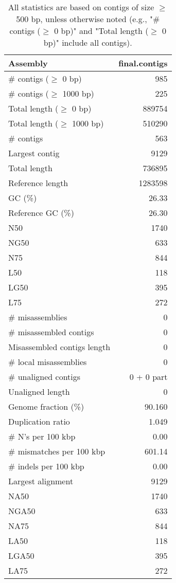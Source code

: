 \documentclass[12pt,a4paper]{article}
\begin{document}
\begin{table}[ht]
\begin{center}
\caption{All statistics are based on contigs of size $\geq$ 500 bp, unless otherwise noted (e.g., "\# contigs ($\geq$ 0 bp)" and "Total length ($\geq$ 0 bp)" include all contigs).}
\begin{tabular}{|l*{1}{|r}|}
\hline
Assembly & final.contigs \\ \hline
\# contigs ($\geq$ 0 bp) & 985 \\ \hline
\# contigs ($\geq$ 1000 bp) & 225 \\ \hline
Total length ($\geq$ 0 bp) & 889754 \\ \hline
Total length ($\geq$ 1000 bp) & 510290 \\ \hline
\# contigs & 563 \\ \hline
Largest contig & 9129 \\ \hline
Total length & 736895 \\ \hline
Reference length & 1283598 \\ \hline
GC (\%) & 26.33 \\ \hline
Reference GC (\%) & 26.30 \\ \hline
N50 & 1740 \\ \hline
NG50 & 633 \\ \hline
N75 & 844 \\ \hline
L50 & 118 \\ \hline
LG50 & 395 \\ \hline
L75 & 272 \\ \hline
\# misassemblies & 0 \\ \hline
\# misassembled contigs & 0 \\ \hline
Misassembled contigs length & 0 \\ \hline
\# local misassemblies & 0 \\ \hline
\# unaligned contigs & 0 + 0 part \\ \hline
Unaligned length & 0 \\ \hline
Genome fraction (\%) & 90.160 \\ \hline
Duplication ratio & 1.049 \\ \hline
\# N's per 100 kbp & 0.00 \\ \hline
\# mismatches per 100 kbp & 601.14 \\ \hline
\# indels per 100 kbp & 0.00 \\ \hline
Largest alignment & 9129 \\ \hline
NA50 & 1740 \\ \hline
NGA50 & 633 \\ \hline
NA75 & 844 \\ \hline
LA50 & 118 \\ \hline
LGA50 & 395 \\ \hline
LA75 & 272 \\ \hline
\end{tabular}
\end{center}
\end{table}
\end{document}
